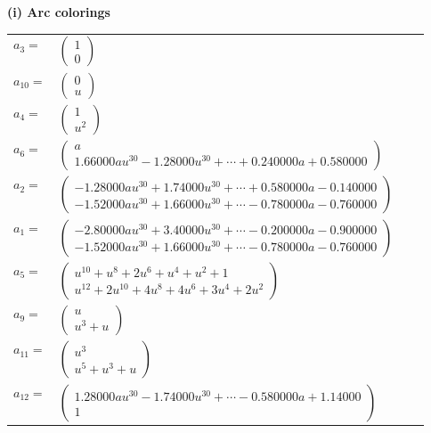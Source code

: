 \documentclass[1p]{elsarticle_modified}
\theoremstyle{definition}
\begin{document}
\flushleft \textbf{(i) Arc colorings}\\
\begin{tabular}{m{7pt} m{180pt} m{7pt} m{180pt} }
\flushright $a_{3}=$&$\begin{pmatrix}1\\0\end{pmatrix}$ \\
\flushright $a_{10}=$&$\begin{pmatrix}0\\u\end{pmatrix}$ \\
\flushright $a_{4}=$&$\begin{pmatrix}1\\u^2\end{pmatrix}$ \\
\flushright $a_{6}=$&$\begin{pmatrix}a\\1.66000 a u^{30}-1.28000 u^{30}+\cdots+0.240000 a+0.580000\end{pmatrix}$ \\
\flushright $a_{2}=$&$\begin{pmatrix}-1.28000 a u^{30}+1.74000 u^{30}+\cdots+0.580000 a-0.140000\\-1.52000 a u^{30}+1.66000 u^{30}+\cdots-0.780000 a-0.760000\end{pmatrix}$ \\
\flushright $a_{1}=$&$\begin{pmatrix}-2.80000 a u^{30}+3.40000 u^{30}+\cdots-0.200000 a-0.900000\\-1.52000 a u^{30}+1.66000 u^{30}+\cdots-0.780000 a-0.760000\end{pmatrix}$ \\
\flushright $a_{5}=$&$\begin{pmatrix}u^{10}+u^8+2 u^6+u^4+u^2+1\\u^{12}+2 u^{10}+4 u^8+4 u^6+3 u^4+2 u^2\end{pmatrix}$ \\
\flushright $a_{9}=$&$\begin{pmatrix}u\\u^3+u\end{pmatrix}$ \\
\flushright $a_{11}=$&$\begin{pmatrix}u^3\\u^5+u^3+u\end{pmatrix}$ \\
\flushright $a_{12}=$&$\begin{pmatrix}1.28000 a u^{30}-1.74000 u^{30}+\cdots-0.580000 a+1.14000\\1\end{pmatrix}$ \\

\end{tabular}
\end{document}
